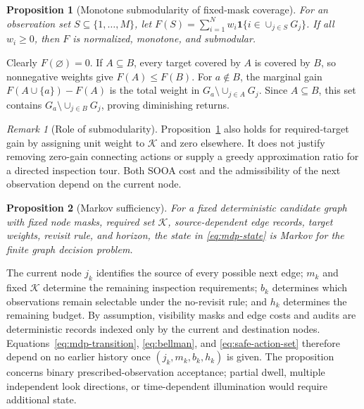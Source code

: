 \documentclass{IEEEtaes}
\newtheorem{proposition}{Proposition}
\theoremstyle{remark}
\newtheorem{remark}{Remark}
\theoremstyle{plain}
\begin{document}
\begin{proposition}[Monotone submodularity of fixed-mask coverage]
\label{prop:submodular-coverage}
For an observation set $S\subseteq\{1,\ldots,M\}$, let $F(S)=\sum_{i=1}^{N}w_i\mathbf1\{i\in\cup_{j\in S}G_j\}$. If all $w_i\ge0$, then $F$ is normalized, monotone, and submodular.
\end{proposition}

\begin{IEEEproof}
Clearly $F(\varnothing)=0$. If $A\subseteq B$, every target covered by $A$ is covered by $B$, so nonnegative weights give $F(A)\le F(B)$. For $a\notin B$, the marginal gain $F(A\cup\{a\})-F(A)$ is the total weight in $G_a\setminus\cup_{j\in A}G_j$. Since $A\subseteq B$, this set contains $G_a\setminus\cup_{j\in B}G_j$, proving diminishing returns.
\end{IEEEproof}

\begin{remark}[Role of submodularity]
Proposition~\ref{prop:submodular-coverage} also holds for required-target gain by assigning unit weight to $\mathcal K$ and zero elsewhere. It does not justify removing zero-gain connecting actions or supply a greedy approximation ratio for a directed inspection tour. Both SOOA cost and the admissibility of the next observation depend on the current node.
\end{remark}

\begin{proposition}[Markov sufficiency]
\label{prop:markov-sufficiency}
For a fixed deterministic candidate graph with fixed node masks, required set $\mathcal K$, source-dependent edge records, target weights, revisit rule, and horizon, the state in \eqref{eq:mdp-state} is Markov for the finite graph decision problem.
\end{proposition}

\begin{IEEEproof}
The current node $j_k$ identifies the source of every possible next edge; $m_k$ and fixed $\mathcal K$ determine the remaining inspection requirements; $b_k$ determines which observations remain selectable under the no-revisit rule; and $h_k$ determines the remaining budget. By assumption, visibility masks and edge costs and audits are deterministic records indexed only by the current and destination nodes. Equations~\eqref{eq:mdp-transition}, \eqref{eq:bellman}, and \eqref{eq:safe-action-set} therefore depend on no earlier history once $(j_k,m_k,b_k,h_k)$ is given. The proposition concerns binary prescribed-observation acceptance; partial dwell, multiple independent look directions, or time-dependent illumination would require additional state.
\end{IEEEproof}
\end{document}

